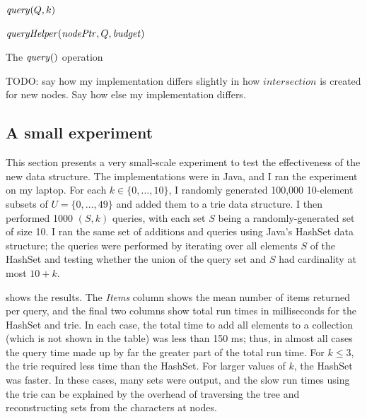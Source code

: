 {
\begin{algorithm}[htb]
 \footnotesize
\DontPrintSemicolon
\nl $\mathit{query}(Q,k)$ \label{queryfunction} \;
\nl {}

\nl $\mathit{queryHelper}(\mathit{nodePtr}, Q,\mathit{budget})$ \label{queryhelperfunction} \;
\nl {}
\caption{The $\mathit{query}()$ operation}
\label{QueryAlgorithm}
\end{algorithm}
}

TODO: say how my implementation differs slightly in how $\mathit{intersection}$
is created for new nodes.  Say how else my implementation differs.

\subsection{A small experiment}

This section presents a very small-scale experiment to test the effectiveness
of the new data structure.
The implementations were in Java, and I ran the experiment on my laptop.
For each $k \in \{0, \dots, 10\}$, I randomly generated
100,000 10-element subsets of $U = \{0, \dots, 49\}$ and added them to a trie
data structure.  I then performed 1000 $(S, k)$ queries, with each set $S$
being a randomly-generated set of size 10.  I ran the same set of additions
and queries using Java's HashSet data structure; the queries were performed
by iterating over all elements $S$ of the HashSet and testing whether the union
of the query set and $S$ had cardinality at most $10 + k$.

 shows the results.  The \emph{Items} column shows the
mean number of items returned per query, and the final two columns show total
run times in milliseconds for the HashSet and trie.  In each case, the total
time to add all elements to a collection (which is not shown in the table) was
less than 150 ms; thus, in almost all cases the query time made up by far the
greater part of the total run time.  For $k \leq 3$, the trie required less
time than the HashSet.  For larger values of $k$, the HashSet was faster.  In
these cases, many sets were output, and the slow run times using the trie can
be explained by the overhead of traversing the tree and reconstructing sets
from the characters at nodes.

